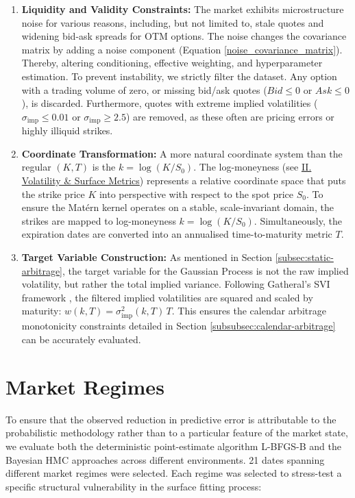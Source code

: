 \documentclass[12pt,oneside]{report}
\theoremstyle{definition}
\theoremstyle{remark}
\begin{document}
\begin{enumerate}
    \item \textbf{Liquidity and Validity Constraints:} 
    The market exhibits microstructure noise for various reasons, including, but not limited to, stale quotes and widening bid-ask spreads for OTM options. The noise changes the covariance matrix by adding a noise component (Equation \ref{noise_covariance_matrix}). Thereby, altering conditioning, effective weighting, and hyperparameter estimation. To prevent instability, we strictly filter the dataset. Any option with a trading volume of zero, or missing bid/ask quotes ($Bid \le 0$ or $Ask \le 0$), is discarded. Furthermore, quotes with extreme implied volatilities ($\sigma_{\text{imp}} \le 0.01$ or $\sigma_{\text{imp}} \ge 2.5$) are removed, as these often are pricing errors or highly illiquid strikes.
    \item \textbf{Coordinate Transformation:} 
    A more natural coordinate system than the regular $(K,T)$ is the $k = \log(K/S_0)$. The log-moneyness (see \hyperref[sec:glossary_volatility_surface_metrics]{II. Volatility \& Surface Metrics}) represents a relative coordinate space that puts the strike price $K$ into perspective with respect to the spot price $S_0$. To ensure the Matérn kernel operates on a stable, scale-invariant domain, the strikes are mapped to log-moneyness $k = \log(K/S_0)$. Simultaneously, the expiration dates are converted into an annualised time-to-maturity metric $T$.
    \item \textbf{Target Variable Construction:} 
    As mentioned in Section \ref{subsec:static-arbitrage}, the target variable for the Gaussian Process is not the raw implied volatility, but rather the total implied variance. Following Gatheral's SVI framework \cite{gatheral2014arbitrage}, the filtered implied volatilities are squared and scaled by maturity: $w(k,T) = \sigma_{\text{imp}}^2(k,T) \, T$. This ensures the calendar arbitrage monotonicity constraints detailed in Section \ref{subsubsec:calendar-arbitrage} can be accurately evaluated.
\end{enumerate}

\section{Market Regimes}
\label{sec:market-regimes}
To ensure that the observed reduction in predictive error is attributable to the probabilistic methodology rather than to a particular feature of the market state, we evaluate both the deterministic point-estimate algorithm L-BFGS-B and the Bayesian HMC approaches across different environments. 21 dates spanning different market regimes were selected. Each regime was selected to stress-test a specific structural vulnerability in the surface fitting process:
\end{document}
